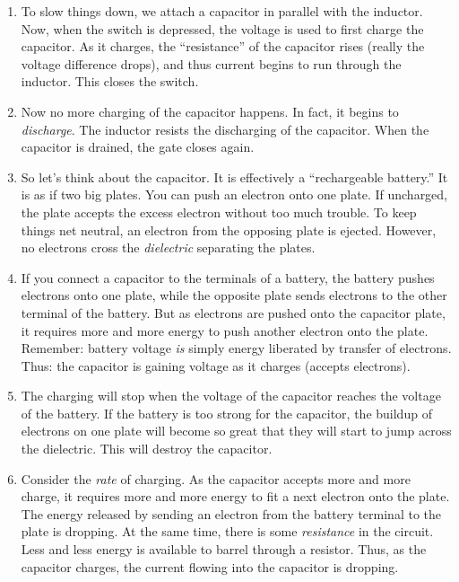 \documentclass[11pt, oneside]{amsart}
\begin{document}
\begin{enumerate}
  \item To slow things down, we attach a capacitor in parallel with the
  inductor. Now, when the switch is depressed, the voltage is used to
  first charge the capacitor. As it charges, the ``resistance'' of the
  capacitor rises (really the voltage difference drops), and thus
  current begins to run through the inductor. This closes the switch.

  \item Now no more charging of the capacitor happens. In fact, it
  begins to \emph{discharge}. The inductor resists the discharging of
  the capacitor. When the capacitor is drained, the gate closes again.

  \item So let's think about the capacitor. It is effectively a
  ``rechargeable battery.'' It is as if two big plates. You can push an
  electron onto one plate. If uncharged, the plate accepts the excess
  electron without too much trouble. To keep things net neutral, an
  electron from the opposing plate is ejected. However, no electrons
  cross the \emph{dielectric} separating the plates.

  \item  If you connect a capacitor to the terminals of a battery, the
  battery pushes electrons onto one plate, while the opposite plate
  sends electrons to the other terminal of the battery. But as electrons
  are pushed onto the capacitor plate, it requires more and more energy
  to push another electron onto the plate. Remember: battery voltage
  \emph{is} simply energy liberated by transfer of electrons. Thus: the
  capacitor is gaining voltage as it charges (accepts electrons).

  \item The charging will stop when the voltage of the capacitor reaches
  the voltage of the battery. If the battery is too strong for the
  capacitor, the buildup of electrons on one plate will become so great
  that they will start to jump across the dielectric. This will destroy
  the capacitor.

  \item Consider the \emph{rate} of charging. As the capacitor accepts
  more and more charge, it requires more and more energy to fit a next
  electron onto the plate. The energy released by sending an electron
  from the battery terminal to the plate is dropping. At the same time,
  there is some \emph{resistance} in the circuit. Less and less energy
  is available to barrel through a resistor. Thus, as the capacitor
  charges, the current flowing into the capacitor is dropping.


\end{enumerate}
\end{document}
